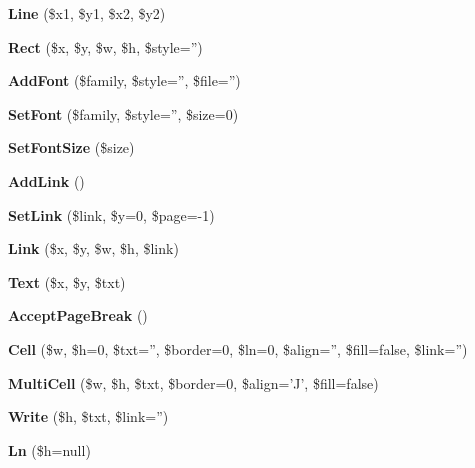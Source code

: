 \begin{DoxyCompactItemize}
\item 
{\bfseries Line} (\$x1, \$y1, \$x2, \$y2)\label{class_f_p_d_f_aa3dc679d089b2a0d559ec4ea72655ce3}

\item 
{\bfseries Rect} (\$x, \$y, \$w, \$h, \$style='')\label{class_f_p_d_f_a1d505dc20dd926ac33cd0aba6d33e300}

\item 
{\bfseries Add\+Font} (\$family, \$style='', \$file='')\label{class_f_p_d_f_a36ad2e708366944522515bab35ca9aea}

\item 
{\bfseries Set\+Font} (\$family, \$style='', \$size=0)\label{class_f_p_d_f_a40df6e672c4bdeec1d3fba17c53ca969}

\item 
{\bfseries Set\+Font\+Size} (\$size)\label{class_f_p_d_f_a1bda00d05f6aff93e9ec63e1d3ee89d9}

\item 
{\bfseries Add\+Link} ()\label{class_f_p_d_f_ae5905a6270028a055eb4b7e6f3def713}

\item 
{\bfseries Set\+Link} (\$link, \$y=0, \$page=-\/1)\label{class_f_p_d_f_a83120ec749f1a41b825108c493c97564}

\item 
{\bfseries Link} (\$x, \$y, \$w, \$h, \$link)\label{class_f_p_d_f_a818159ed11bab8ca6ca0b1ea3f37f537}

\item 
{\bfseries Text} (\$x, \$y, \$txt)\label{class_f_p_d_f_abb693168e0ea67fac4309f89d67fd4fc}

\item 
{\bfseries Accept\+Page\+Break} ()\label{class_f_p_d_f_a04677ba6156d261fc1cbe51a3041eb24}

\item 
{\bfseries Cell} (\$w, \$h=0, \$txt='', \$border=0, \$ln=0, \$align='', \$fill=false, \$link='')\label{class_f_p_d_f_a0e190676315f5c08794034bd3d9cb073}

\item 
{\bfseries Multi\+Cell} (\$w, \$h, \$txt, \$border=0, \$align='J', \$fill=false)\label{class_f_p_d_f_a83d05ed30ef47ec3e5722850e4ef50d6}

\item 
{\bfseries Write} (\$h, \$txt, \$link='')\label{class_f_p_d_f_a7c544835cb8490e81866ab8a831cb101}

\item 
{\bfseries Ln} (\$h=null)\label{class_f_p_d_f_a13ddcf5ade8959053e62198a3a88a3ff}


\end{DoxyCompactItemize}
